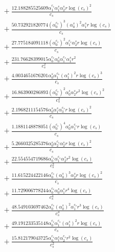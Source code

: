 \documentclass[10pt]{article}
\begin{document}
\begin{align*}
&{}  + \frac{12.188285525609 \alpha_{1}^{c_s} \alpha_{1}^s \alpha_{2}^s r \log{\left(c_{s} \right)}^{2}}{c_{s}} \\
&{}  + \frac{50.732921820774 \left(\alpha_{0}^{c_s}\right)^{3} \left(\alpha_{0}^s\right)^{2} \alpha_{1}^s r \log{\left(c_{s} \right)}}{c_{s}} \\
&{}  + \frac{27.775184091118 \left(\alpha_{0}^{c_s}\right)^{2} \alpha_{1}^{c_s} \alpha_{2}^s r \log{\left(c_{s} \right)}}{c_{s}} \\
&{}  + \frac{231.76628399015 \alpha_{0}^{c_s} \alpha_{0}^s \alpha_{1}^{c_s} \alpha_{1}^s r^{2}}{c_{s}^{2}} \\
&{}  + \frac{4.0034651676201 \alpha_{0}^s \alpha_{1}^{c_s} \left(\alpha_{1}^s\right)^{2} r \log{\left(c_{s} \right)}^{3}}{c_{s}} \\
&{}  + \frac{16.863900286893 \left(\alpha_{0}^{c_s}\right)^{2} \alpha_{0}^s \alpha_{2}^s r^{2} \log{\left(c_{s} \right)}^{2}}{c_{s}^{2}} \\
&{}  + \frac{2.1968211154576 \alpha_{0}^s \alpha_{1}^s \alpha_{3}^{c_s} r \log{\left(c_{s} \right)}^{2}}{c_{s}} \\
&{}  + \frac{1.1881148878051 \left(\alpha_{0}^{c_s}\right)^{4} \alpha_{0}^s \alpha_{1}^{c_s} r \log{\left(c_{s} \right)}}{c_{s}} \\
&{}  + \frac{5.2660325285376 \alpha_{0}^s \alpha_{2}^{c_s} \alpha_{2}^s r \log{\left(c_{s} \right)}^{2}}{c_{s}} \\
&{}  + \frac{22.554554719686 \alpha_{0}^{c_s} \alpha_{1}^{c_s} \alpha_{2}^s r^{2} \log{\left(c_{s} \right)}}{c_{s}^{2}} \\
&{}  + \frac{11.615224422146 \alpha_{0}^{c_s} \left(\alpha_{0}^s\right)^{3} \alpha_{2}^s r \log{\left(c_{s} \right)}^{2}}{c_{s}} \\
&{}  + \frac{11.729006778244 \alpha_{0}^{c_s} \alpha_{0}^s \alpha_{1}^s r^{4} \log{\left(c_{s} \right)}}{c_{s}^{4}} \\
&{}  + \frac{48.549103697462 \alpha_{0}^{c_s} \left(\alpha_{0}^s\right)^{2} \alpha_{1}^{c_s} r^{3} \log{\left(c_{s} \right)}}{c_{s}^{3}} \\
&{}  + \frac{49.191233535148 \alpha_{0}^{c_s} \alpha_{1}^{c_s} \left(\alpha_{1}^s\right)^{2} r \log{\left(c_{s} \right)}}{c_{s}} \\
&{}  + \frac{15.812179043725 \alpha_{0}^{c_s} \alpha_{1}^s \alpha_{2}^{c_s} r^{2} \log{\left(c_{s} \right)}}{c_{s}^{2}}
\end{align*}
\end{document}
